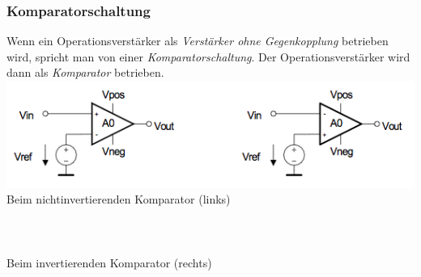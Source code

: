 		\subsubsection{Komparatorschaltung }
			\begin{minipage}{18cm}
            	Wenn ein Operationsverstärker als {\it Verstärker ohne
            	Gegenkopplung} betrieben wird, spricht man von einer {\it
            	Komparatorschaltung}. Der Operationsverstärker wird dann als {\it
            	Komparator} betrieben.\\
            	\includegraphics[width=16cm]{./bilder/komparator.png}\\
            	Beim nichtinvertierenden Komparator (links)\\
            	\hspace*{10mm}\\
            	\hspace*{10mm}\\ \\
            	Beim invertierenden Komparator (rechts)\\
            	\hspace*{10mm}\\
            	\hspace*{10mm}\\
            \end{minipage}

